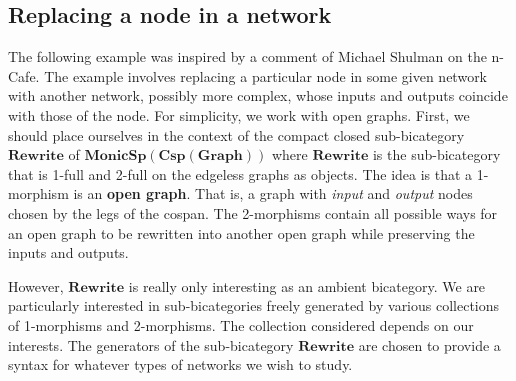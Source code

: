 \documentclass{tac}
\newcommand{\cat}[1]{\mathbf{#1}}
\newcommand{\bimonspcsp}[1]{\mathbf{MonicSp(Csp(#1))}}
\theoremstyle{remark}
\theoremstyle{definition}
\begin{document}
\subsection{Replacing a node in a network}
\label{subsec:Replacing a node in a network}

The following example was inspired 
by a comment of Michael Shulman \cite{Shul} 
on the n-Cafe.
The example involves replacing a particular node 
in some given network with another network, 
possibly more complex, 
whose inputs and outputs 
coincide with those of the node. 
For simplicity, we work with open graphs.
First, we should place ourselves
in the context of the 
compact closed sub-bicategory
$\cat{Rewrite}$ of $\bimonspcsp{Graph}$ where $\mathbf{Rewrite}$ is the sub-bicategory
that is 1-full and 2-full on the edgeless graphs as objects.
The idea is that a 1-morphism is 
an \textbf{open graph}.
That is, a graph with 
\emph{input} and \emph{output} nodes 
chosen by the legs of the cospan. 
The 2-morphisms contain 
all possible ways for an open graph 
to be rewritten into another open graph
while preserving the inputs and outputs.

However, $\cat{Rewrite}$ is really only 
interesting as an ambient bicategory.  
We are particularly interested in 
sub-bicategories freely generated by 
various collections of 
1-morphisms and 2-morphisms. 
The collection considered
depends on our interests.
The generators of the sub-bicategory $\mathbf{Rewrite}$
are chosen to provide a syntax
for whatever types of networks we wish to study.
\end{document}
